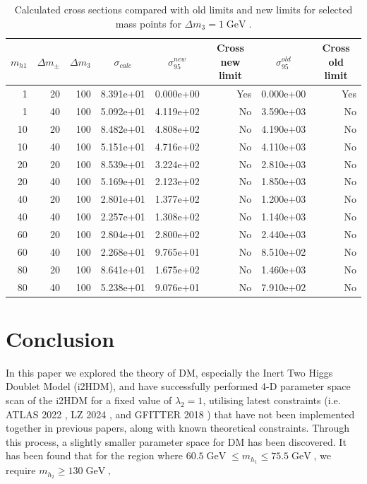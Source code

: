 \documentclass[12pt]{article}
\newcommand{\gev}{\mathrel{\text{ GeV}}}
\newcommand{\gevs}{\mathrel{\text{ GeV }}}
\newcommand{\mhone}{m_{h_1}}
\newcommand{\mhtwo}{m_{h_2}}
\begin{document}
\begin{table}[H]
    \caption{Calculated cross sections compared with old limits and new limits for selected mass points for $\Delta m_3 = 1\gev$.}
    \label{tab:cross_section_limits_100}
\begin{tabular}{rrrrrrrr}
\toprule
    \multicolumn{1}{c}{$m_{h1}$} & 
    \multicolumn{1}{c}{$\Delta m_\pm$} & 
    \multicolumn{1}{c}{$\Delta m_3$} & 
    \multicolumn{1}{c}{$\sigma_{calc}$} & 
    \multicolumn{1}{c}{$\sigma^{new}_{95}$} & 
    \multicolumn{1}{c}{Cross new limit} & 
    \multicolumn{1}{c}{$\sigma^{old}_{95}$} & 
    \multicolumn{1}{c}{Cross old limit} \\
    \midrule
1 & 20 & 100 & 8.391e+01 & 0.000e+00 & Yes & 0.000e+00 & Yes \\
1 & 40 & 100 & 5.092e+01 & 4.119e+02 & No & 3.590e+03 & No \\
10 & 20 & 100 & 8.482e+01 & 4.808e+02 & No & 4.190e+03 & No \\
10 & 40 & 100 & 5.151e+01 & 4.716e+02 & No & 4.110e+03 & No \\
20 & 20 & 100 & 8.539e+01 & 3.224e+02 & No & 2.810e+03 & No \\
20 & 40 & 100 & 5.169e+01 & 2.123e+02 & No & 1.850e+03 & No \\
40 & 20 & 100 & 2.801e+01 & 1.377e+02 & No & 1.200e+03 & No \\
40 & 40 & 100 & 2.257e+01 & 1.308e+02 & No & 1.140e+03 & No \\
60 & 20 & 100 & 2.804e+01 & 2.800e+02 & No & 2.440e+03 & No \\
60 & 40 & 100 & 2.268e+01 & 9.765e+01 & No & 8.510e+02 & No \\
80 & 20 & 100 & 8.641e+01 & 1.675e+02 & No & 1.460e+03 & No \\
80 & 40 & 100 & 5.238e+01 & 9.076e+01 & No & 7.910e+02 & No \\
\bottomrule
\end{tabular}
\end{table}

\section{Conclusion}
\label{sec:conclusion}
In this paper we explored the theory of DM, especially the Inert Two Higgs Doublet Model (i2HDM), and have successfully performed 4-D parameter space scan of the i2HDM for a fixed value of $\lambda_2 = 1$, utilising latest constraints (i.e. ATLAS 2022 \cite{ATLAS:2022yvh}, LZ 2024 \cite{aalbers2024darkmattersearchresults}, and GFITTER 2018 \cite{gfitter2018}) that have not been implemented together in previous papers, along with known theoretical constraints. Through this process, a slightly smaller parameter space for DM has been discovered. It has been found that for the region where $ 60.5 \gevs\leq \mhone \leq75.5 \gev$, we require $\mhtwo \geq 130 \gev, $
\end{document}
